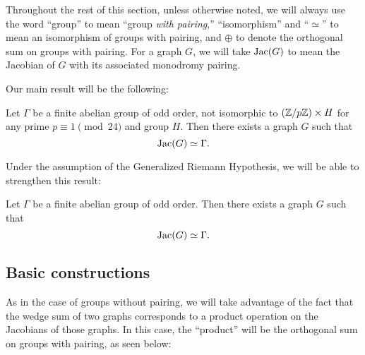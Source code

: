 \documentclass{amsart}
\begin{document}
\begin{note}
  Throughout the rest of this section, unless otherwise noted, we will
  always use the word ``group'' to mean ``group \emph{with pairing},''
  ``isomorphism'' and ``$\simeq$'' to mean an isomorphism of groups
  with pairing, and $\oplus$ to denote the orthogonal sum on groups
  with pairing. For a graph $G$, we will take $\operatorname{Jac}(G)$ to mean the
  Jacobian of $G$ with its associated monodromy pairing.
\end{note}

Our main result will be the following:

\begin{thm}
  \label{thm:graph_pairing}
  Let $\Gamma$ be a finite abelian group of odd order, not isomorphic
  to $(\mathbb{Z}/p\mathbb{Z}) \times H$ for any prime $p \equiv 1 \pmod {24}$ and
  group $H$. Then there exists a graph $G$ such that
  \[
  \operatorname{Jac}(G) \simeq \Gamma.
  \]
\end{thm}

Under the assumption of the Generalized Riemann Hypothesis, we will be
able to strengthen this result:

\begin{thm}
  \label{thm:graph_pairing_grh}
  Let $\Gamma$ be a finite abelian group of odd order. Then there
  exists a graph $G$ such that
  \begin{equation*}
    \operatorname{Jac}(G) \simeq \Gamma.
  \end{equation*}
\end{thm}

\subsection{Basic constructions}

As in the case of groups without pairing, we will take advantage of
the fact that the wedge sum of two graphs corresponds to a product
operation on the Jacobians of those graphs. In this case, the
``product'' will be the orthogonal sum on groups with pairing, as seen
below:
\end{document}
